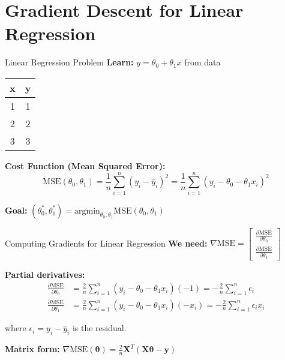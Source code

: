 \documentclass[aspectratio=169,11pt]{beamer}
\newcommand{\grad}{\nabla}
\newcommand{\vtheta}{\bm{\theta}}
\newcommand{\vy}{\bm{y}}
\newcommand{\mX}{\bm{X}}
\newcommand{\MSE}{\text{MSE}}
\newcommand{\argmin}{\text{argmin}}
\begin{document}
\section{Gradient Descent for Linear Regression}

\begin{frame}{Linear Regression Problem}
\textbf{Learn:} $y = \theta_0 + \theta_1 x$ from data

\begin{center}
\begin{tabular}{|c|c|}
\hline
\textbf{x} & \textbf{y} \\
\hline
1 & 1 \\
2 & 2 \\
3 & 3 \\
\hline
\end{tabular}
\end{center}

\pause
\textbf{Cost Function (Mean Squared Error):}
\[\MSE(\theta_0, \theta_1) = \frac{1}{n}\sum_{i=1}^n (y_i - \hat{y}_i)^2 = \frac{1}{n}\sum_{i=1}^n (y_i - \theta_0 - \theta_1 x_i)^2\]

\pause
\textbf{Goal:} $(\theta_0^*, \theta_1^*) = \argmin_{\theta_0, \theta_1} \MSE(\theta_0, \theta_1)$
\end{frame}

\begin{frame}{Computing Gradients for Linear Regression}
\textbf{We need:} $\grad \MSE = \begin{bmatrix} \frac{\partial \MSE}{\partial \theta_0} \\ \frac{\partial \MSE}{\partial \theta_1} \end{bmatrix}$

\pause
\textbf{Partial derivatives:}
\begin{align}
\frac{\partial \MSE}{\partial \theta_0} &= \frac{2}{n}\sum_{i=1}^n (y_i - \theta_0 - \theta_1 x_i)(-1) = -\frac{2}{n}\sum_{i=1}^n \epsilon_i\\
\frac{\partial \MSE}{\partial \theta_1} &= \frac{2}{n}\sum_{i=1}^n (y_i - \theta_0 - \theta_1 x_i)(-x_i) = -\frac{2}{n}\sum_{i=1}^n \epsilon_i x_i
\end{align}

where $\epsilon_i = y_i - \hat{y}_i$ is the residual.

\pause
\textbf{Matrix form:} $\grad \MSE(\vtheta) = \frac{2}{n}\mX^T(\mX\vtheta - \vy)$
\end{frame}
\end{document}
